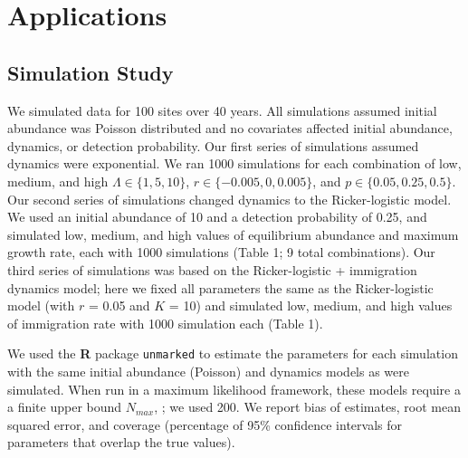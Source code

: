 \documentclass[12pt]{article}
\begin{document}




\section{Applications}
\label{sec:app}

\subsection{Simulation Study}


We simulated data for 100 sites over 40 years.  All
simulations assumed initial abundance was Poisson distributed
and no covariates affected initial abundance, dynamics, or
detection probability.  Our first series of simulations
assumed dynamics were exponential.  We ran 1000 simulations for
each combination of low, medium, and high $\Lambda \in
\{1,5,10\}$, $r \in \{-0.005, 0, 0.005\}$, and
$p \in \{0.05, 0.25, 0.5\}$. %
Our second series of simulations changed dynamics to the Ricker-logistic
model. We used an initial abundance of 10 and a detection probability
of 0.25, and simulated low, medium, and high values of equilibrium
abundance and maximum growth rate, each with 1000 simulations (Table 1;
9 total combinations). Our third series of simulations was based
on the Ricker-logistic + immigration dynamics model; here we fixed all
parameters the same as the Ricker-logistic model (with $r$ = 0.05 and $K$ = 10) and
simulated low, medium, and high values of immigration rate with 1000
simulation each (Table 1).

We used the \textbf{R} package \texttt{unmarked} to estimate the parameters 
for each simulation with the same
initial abundance (Poisson) and dynamics models as were simulated.
When run in a maximum likelihood framework, these models require a
a finite upper bound $N_{max}$,
\citep{royle:2004biom,dail_madsen:2011};
we used 200.  We report bias of estimates, root
mean squared error, and coverage (percentage of 95\% confidence
intervals for parameters that overlap the true values).
\end{document}
